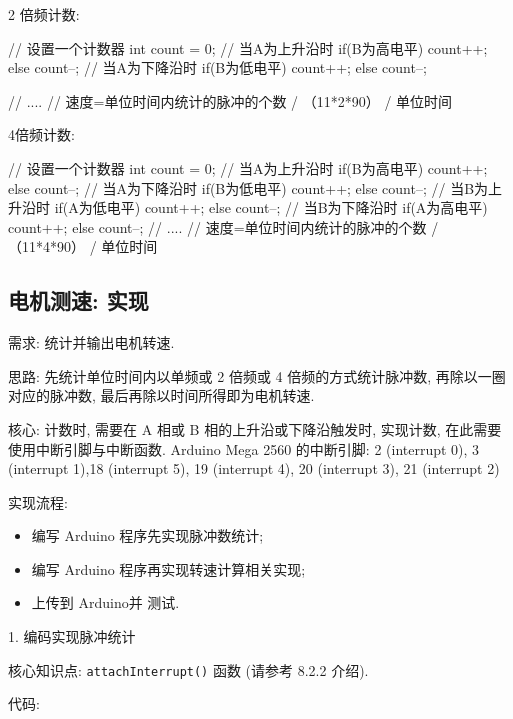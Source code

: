 \documentclass[openany, fontset=windowsold]{ctexbook}
\theoremstyle{kaiti}
\theoremstyle{normal}
\begin{document}
2 倍频计数:

\begin{cpp}
  // 设置一个计数器
  int count = 0;
  // 当A为上升沿时
  if(B为高电平){
      count++;
  }else {
      count--;
  }
  // 当A为下降沿时
  if(B为低电平){
      count++;
  }else {
      count--;
  }

  // ....
  // 速度=单位时间内统计的脉冲的个数 / （11*2*90） / 单位时间
\end{cpp}

4倍频计数:

\begin{cpp}
  // 设置一个计数器
  int count = 0;
  // 当A为上升沿时
  if(B为高电平){
      count++;
  }else {
      count--;
  }
  // 当A为下降沿时
  if(B为低电平){
      count++;
  }else {
      count--;
  }
  // 当B为上升沿时
  if(A为低电平){
      count++;
  } else {
      count--;
  }
  // 当B为下降沿时
  if(A为高电平){
      count++;
  } else {
      count--;
  }
  // ....
  // 速度=单位时间内统计的脉冲的个数 / （11*4*90） / 单位时间
\end{cpp}

\subsection{电机测速: 实现}

需求: 统计并输出电机转速.

思路: 先统计单位时间内以单频或 2 倍频或 4 倍频的方式统计脉冲数, 再除以一圈对应的脉冲数, 最后再除以时间所得即为电机转速.

核心: 计数时, 需要在 A 相或 B 相的上升沿或下降沿触发时, 实现计数, 在此需要使用中断引脚与中断函数. Arduino Mega 2560 的中断引脚: 2 (interrupt 0), 3 (interrupt 1),18 (interrupt 5), 19 (interrupt 4), 20 (interrupt 3), 21 (interrupt 2)

实现流程:

\begin{itemize}
  \item 编写 Arduino 程序先实现脉冲数统计; 
  \item 编写 Arduino 程序再实现转速计算相关实现; 
  \item 上传到 Arduino并 测试.
\end{itemize}

1. 编码实现脉冲统计

核心知识点: \verb|attachInterrupt()| 函数 (请参考 8.2.2 介绍).

代码:
\end{document}
